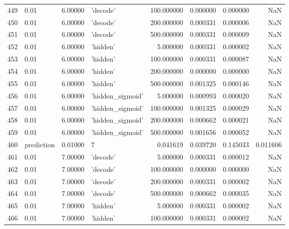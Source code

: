 \documentclass[10pt,a4paper]{article}
\begin{document}
\begin{tabular}{llrlrrrr}
449  &        0.01 &   6.00000 &           'decode' &  100.000000 &  0.000000 &  0.000000 &       NaN \\
450  &        0.01 &   6.00000 &           'decode' &  200.000000 &  0.000331 &  0.000006 &       NaN \\
451  &        0.01 &   6.00000 &           'decode' &  500.000000 &  0.000331 &  0.000009 &       NaN \\
452  &        0.01 &   6.00000 &           'hidden' &    5.000000 &  0.000331 &  0.000002 &       NaN \\
453  &        0.01 &   6.00000 &           'hidden' &  100.000000 &  0.000331 &  0.000087 &       NaN \\
454  &        0.01 &   6.00000 &           'hidden' &  200.000000 &  0.000000 &  0.000000 &       NaN \\
455  &        0.01 &   6.00000 &           'hidden' &  500.000000 &  0.001325 &  0.000146 &       NaN \\
456  &        0.01 &   6.00000 &   'hidden\_sigmoid' &    5.000000 &  0.000993 &  0.000020 &       NaN \\
457  &        0.01 &   6.00000 &   'hidden\_sigmoid' &  100.000000 &  0.001325 &  0.000029 &       NaN \\
458  &        0.01 &   6.00000 &   'hidden\_sigmoid' &  200.000000 &  0.000662 &  0.000021 &       NaN \\
459  &        0.01 &   6.00000 &   'hidden\_sigmoid' &  500.000000 &  0.001656 &  0.000052 &       NaN \\
460  &  prediction &   0.01000 &                  7 &    0.041619 &  0.039720 &  0.145033 &  0.011606 \\
461  &        0.01 &   7.00000 &           'decode' &    5.000000 &  0.000331 &  0.000012 &       NaN \\
462  &        0.01 &   7.00000 &           'decode' &  100.000000 &  0.000000 &  0.000000 &       NaN \\
463  &        0.01 &   7.00000 &           'decode' &  200.000000 &  0.000331 &  0.000002 &       NaN \\
464  &        0.01 &   7.00000 &           'decode' &  500.000000 &  0.000662 &  0.000035 &       NaN \\
465  &        0.01 &   7.00000 &           'hidden' &    5.000000 &  0.000331 &  0.000002 &       NaN \\
466  &        0.01 &   7.00000 &           'hidden' &  100.000000 &  0.000331 &  0.000002 &       NaN \\

\end{tabular}
\end{document}

